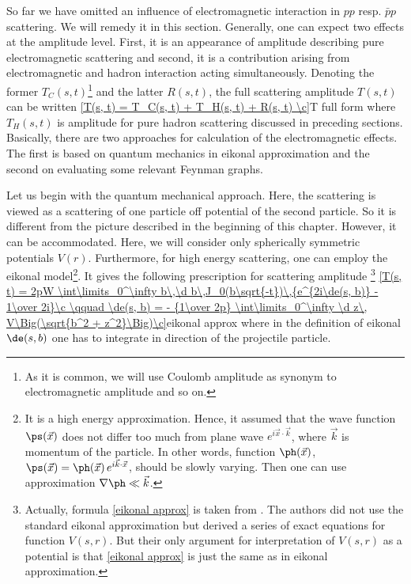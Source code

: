 So far we have omitted an influence of electromagnetic interaction in $pp$ resp. $\bar pp$ scattering. We will remedy it in this section. Generally, one can expect two effects at the amplitude level. First, it is an appearance of amplitude describing pure electromagnetic scattering and second, it is a contribution arising from electromagnetic and hadron interaction acting simultaneously. Denoting the former $T_C(s, t)$\footnote{As it is common, we will use Coulomb amplitude as synonym to electromagnetic amplitude and so on.} and the latter $R(s, t)$, the full scattering amplitude $T(s, t)$ can be written
\eqref{T(s, t) = T_C(s, t) + T_H(s, t) + R(s, t) \c}{T full form}
where $T_H(s, t)$ is amplitude for pure hadron scattering discussed in preceding sections. Basically, there are two approaches for calculation of the electromagnetic effects. The first is based on quantum mechanics in eikonal approximation and the second on evaluating some relevant Feynman graphs.

Let us begin with the quantum mechanical approach. Here, the scattering is viewed as a scattering of one particle off potential of the second particle. So it is different from the picture described in the beginning of this chapter. However, it can be accommodated. Here, we will consider only spherically symmetric potentials $V(r)$. Furthermore, for high energy scattering, one can employ the eikonal model\footnote{It is a high energy approximation. Hence, it assumed that the wave function $\ps(\vec x)$ does not differ too much from plane wave $e^{i\vec x\cdot\vec k}$, where $\vec k$ is momentum of the particle. In other words, function $\ph(\vec x)$, $\ps(\vec x) = \ph(\vec x)\,e^{i\vec k\cdot\vec x}$, should be slowly varying. Then one can use approximation $\nabla \ph \ll \vec k$.}.
It gives the following prescription for scattering amplitude \footnote{Actually, formula \ref{eikonal approx} is taken from . The authors did not use the standard eikonal approximation but derived a series of exact equations for function $V(s, r)$. But their only argument for interpretation of $V(s, r)$ as a potential is that \equ{} \ref{eikonal approx} is just the same as in eikonal approximation.}
\eqref{T(s, t) = 2pW \int\limits_0^\infty b\,\d b\,J_0(b\sqrt{-t})\,{e^{2i\de(s, b)} - 1\over 2i}\c \qquad \de(s, b) = - {1\over 2p} \int\limits_0^\infty \d z\, V\Big(\sqrt{b^2 + z^2}\Big)\c}{eikonal approx}
where in the definition of eikonal $\de(s, b)$ one has to integrate in direction of the projectile particle. 

